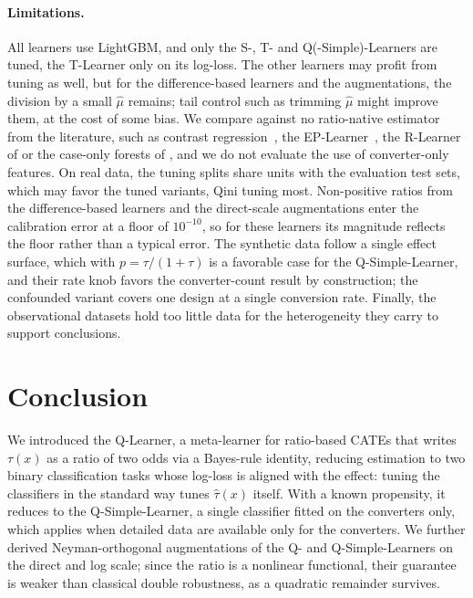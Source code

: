 \documentclass{article}
\begin{document}
\paragraph{Limitations.}
All learners use LightGBM, and only the S-, T- and Q(-Simple)-Learners are
tuned, the T-Learner only on its log-loss. The other learners may profit from
tuning as well, but for the difference-based learners and the augmentations,
the division by a small $\hat\mu$ remains; tail control such as trimming
$\hat\mu$ might improve them, at the cost of some bias. We compare against no
ratio-native estimator from the literature, such as
contrast regression~\citep{yadlowsky2021ratio}, the EP-Learner~\citep{vanderlaan2024combining},
the R-Learner of \citet{ge2026orthogonal} or the case-only forests of
\citet{dai2019trees}, and we do not evaluate the use of converter-only
features.
On real data, the tuning splits share units with the evaluation test sets,
which may favor the tuned variants, Qini tuning most. Non-positive ratios
from the difference-based learners and the direct-scale augmentations enter
the calibration error at a floor of $10^{-10}$, so for these learners its
magnitude reflects the floor rather
than a typical error. The synthetic data follow a single effect surface,
which with $p = \tau/(1+\tau)$ is a favorable case for the Q-Simple-Learner,
and their rate knob favors the converter-count result by construction; the
confounded variant covers one design at a single conversion rate. Finally,
the observational datasets hold too little data for the heterogeneity they
carry to support conclusions.

\section{Conclusion}
\label{sec:conclusion}

We introduced the Q-Learner, a meta-learner for ratio-based CATEs that
writes $\tau(x)$ as a ratio of two odds via a Bayes-rule
identity, reducing estimation to two binary classification tasks whose
log-loss is aligned with the effect: tuning the classifiers in the standard
way tunes $\hat\tau(x)$ itself. With a known propensity, it reduces to the
Q-Simple-Learner, a single classifier fitted on the converters only, which
applies when detailed data are available only for the converters. We further derived
Neyman-orthogonal augmentations of the Q- and Q-Simple-Learners on the direct
and log scale; since the ratio is a nonlinear functional, their guarantee is
weaker than classical double robustness, as a quadratic remainder survives.
\end{document}
